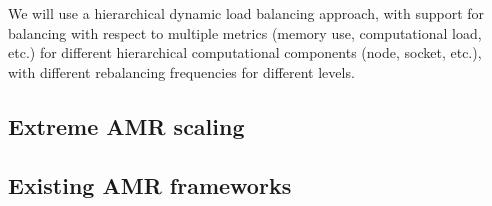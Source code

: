 \documentclass[14pt,letter]{article}
\begin{document}

We will use a hierarchical dynamic load balancing approach, with
support for balancing with respect to multiple metrics (memory use,
computational load, etc.) for different hierarchical computational
components (node, socket, etc.), with different rebalancing
frequencies for different levels.

\subsection{Extreme AMR scaling} \label{ss:amr-scaling}

\subsection{Existing AMR frameworks} \label{ss:review}
\end{document}
